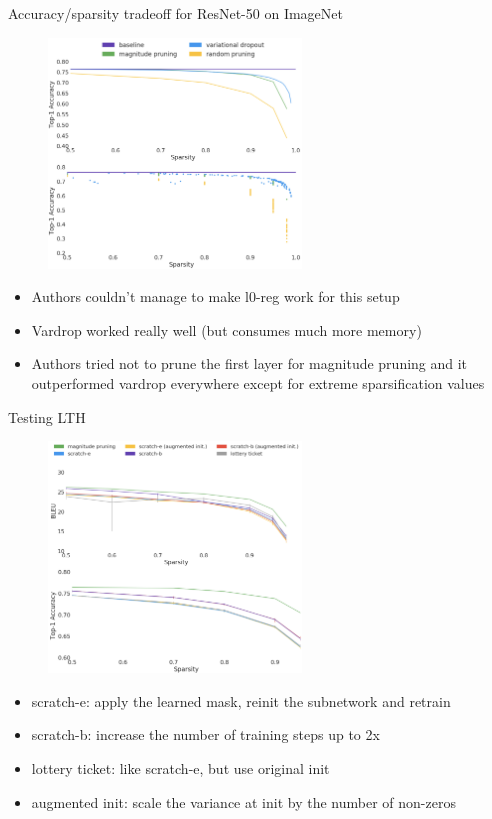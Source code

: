 \documentclass[handout, 10pt]{beamer}
\begin{document}
\begin{frame}{Accuracy/sparsity tradeoff for ResNet-50 on ImageNet}
\begin{figure}
    \centering
    \includegraphics[width=0.6\textwidth]{images/sparsity-imagenet.png}
\end{figure}

\begin{itemize}
    \item Authors couldn't manage to make l0-reg work for this setup
    \item Vardrop worked really well (but consumes much more memory)
    \item Authors tried not to prune the first layer for magnitude pruning and it outperformed vardrop everywhere except for extreme sparsification values
\end{itemize}

\end{frame}


\begin{frame}{Testing LTH}
\begin{figure}
    \centering
    \includegraphics[width=0.6\textwidth]{images/sparsity-lth.png}
\end{figure}

\begin{itemize}
    \item scratch-e: apply the learned mask, reinit the subnetwork and retrain
    \item scratch-b: increase the number of training steps up to 2x
    \item lottery ticket: like scratch-e, but use original init
    \item augmented init: scale the variance at init by the number of non-zeros
\end{itemize}
\end{frame}
\end{document}
